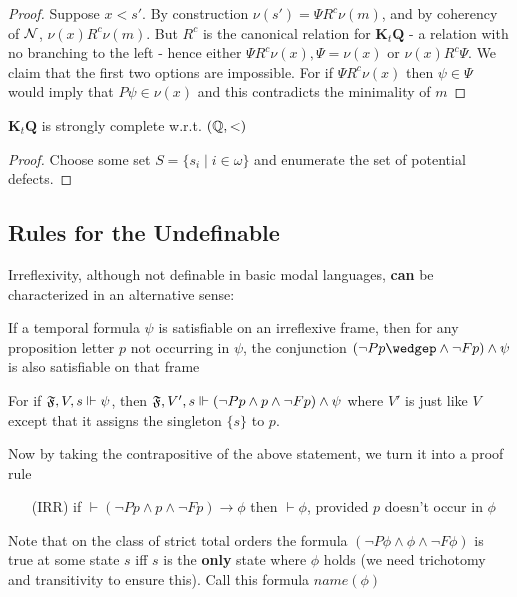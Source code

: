 \documentclass[11pt]{article}
\newcommand{\KtQ}{\textbf{K}_t\textbf{Q}}
\begin{document}
\begin{proof}
Suppose \(x<s'\). By construction \(\nu(s')=\Psi R^c\nu(m)\), and by coherency
of \(\mathcal{N}\), \(\nu(x)R^c\nu(m)\). But \(R^c\) is the canonical relation for
\(\KtQ\) - a relation with no branching to the left - hence either \(\Psi
   R^c\nu(x),\Psi=\nu(x)\) or \(\nu(x)R^c\Psi\). We claim that the first two
options are impossible. For if \(\Psi R^c\nu(x)\) then \(\psi\in\Psi\) would
imply that \(P\psi\in\nu(x)\) and this contradicts the minimality of \(m\)
\end{proof}

\begin{theorem}[]
\(\KtQ\) is strongly complete w.r.t. \((\mathbb{Q},<)\)
\end{theorem}

\begin{proof}
Choose some set \(S=\{s_i\mid i\in\omega\}\) and enumerate the set of
potential defects.
\end{proof}
\subsection{Rules for the Undefinable}
\label{sec:orgab9bb15}
Irreflexivity, although not definable in basic modal languages, \textbf{can} be
characterized in an alternative sense:
\begin{center}
If a temporal formula \(\psi\) is satisfiable on an irreflexive frame, then for any
proposition letter \(p\) not occurring in \(\psi\), the conjunction \((\neg
   Pp\wedgep\wedge\neg Fp)\wedge\psi\) is also satisfiable on that frame
\end{center}
For if \(\mathfrak{F},V,s\Vdash\psi\), then
\(\mathfrak{F},V',s\Vdash(\neg Pp\wedge p\wedge\neg Fp)\wedge\psi\) where \(V'\) is
just like \(V\) except that it assigns the singleton \(\{s\}\) to \(p\).

Now by taking the contrapositive of the above statement, we turn it into a
proof rule

\begin{itemize}
\item [(IRR)] if \(\vdash(\neg Pp\wedge p\wedge\neg Fp)\to\phi\) then \(\vdash\phi\), provided
\(p\) doesn't occur in \(\phi\)
\end{itemize}

Note that on the class of strict total orders the formula
\((\neg P\phi\wedge\phi\wedge\neg F\phi)\) is true at some state \(s\) iff
\(s\) is the \textbf{only} state where \(\phi\) holds (we need trichotomy and transitivity to
ensure this). Call this formula \(name(\phi)\)
\end{document}
